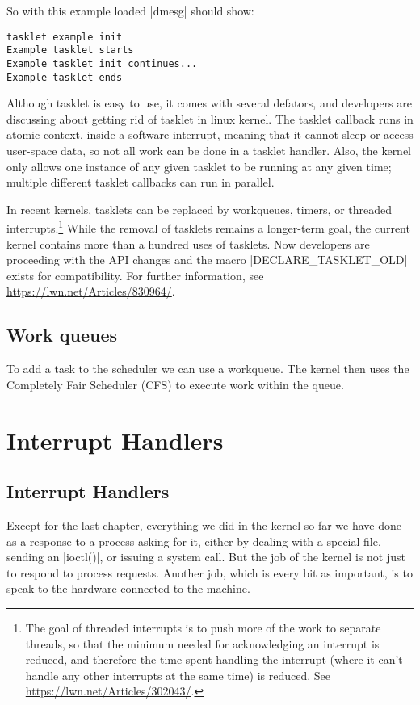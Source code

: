 \documentclass[10pt, oneside]{book}
\begin{document}

So with this example loaded \sh|dmesg| should show:

\begin{verbatim}
tasklet example init
Example tasklet starts
Example tasklet init continues...
Example tasklet ends
\end{verbatim}
Although tasklet is easy to use, it comes with several defators, and developers are discussing about getting rid of tasklet in linux kernel.
The tasklet callback runs in atomic context, inside a software interrupt, meaning that it cannot sleep or access user-space data, so not all work can be done in a tasklet handler.
Also, the kernel only allows one instance of any given tasklet to be running at any given time; multiple different tasklet callbacks can run in parallel.

In recent kernels, tasklets can be replaced by workqueues, timers, or threaded interrupts.\footnote{The goal of threaded interrupts is to push more of the work to separate threads, so that the minimum needed for acknowledging an interrupt is reduced, and therefore the time spent handling the interrupt (where it can't handle any other interrupts at the same time) is reduced.
See \url{https://lwn.net/Articles/302043/}.}
While the removal of tasklets remains a longer-term goal, the current kernel contains more than a hundred uses of tasklets.
Now developers are proceeding with the API changes and the macro \cpp|DECLARE_TASKLET_OLD| exists for compatibility.
For further information, see \url{https://lwn.net/Articles/830964/}.

\subsection{Work queues}
\label{sec:workqueue}
To add a task to the scheduler we can use a workqueue.
The kernel then uses the Completely Fair Scheduler (CFS) to execute work within the queue.


\section{Interrupt Handlers}
\label{sec:interrupt_handler}
\subsection{Interrupt Handlers}
\label{sec:irq}
Except for the last chapter, everything we did in the kernel so far we have done as a response to a process asking for it, either by dealing with a special file, sending an \cpp|ioctl()|, or issuing a system call.
But the job of the kernel is not just to respond to process requests.
Another job, which is every bit as important, is to speak to the hardware connected to the machine.
\end{document}

